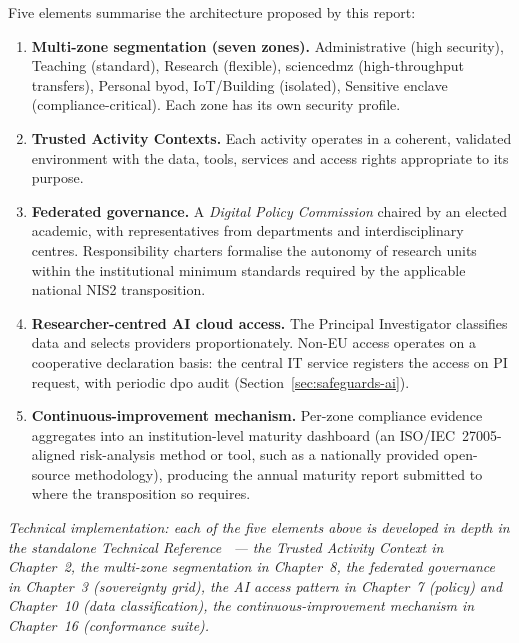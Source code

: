 Five elements summarise the architecture proposed by this
report:

\begin{enumerate}[nosep]
    \item \textbf{Multi-zone segmentation (seven zones).}
    Administrative (high security), Teaching (standard),
    Research (flexible), \gls{sciencedmz} (high-throughput
    transfers), Personal \gls{byod}, IoT/Building (isolated),
    Sensitive enclave (compliance-critical). Each zone has its
    own security profile.
    \item \textbf{Trusted Activity Contexts.} Each activity
    operates in a coherent, validated environment with the data,
    tools, services and access rights appropriate to its
    purpose.
    \item \textbf{Federated governance.} A
    \emph{Digital Policy Commission} chaired by an elected
    academic, with representatives from departments and
    interdisciplinary centres. Responsibility charters formalise
    the autonomy of research units within the institutional
    minimum standards required by the applicable national NIS2
    transposition.
    \item \textbf{Researcher-centred AI cloud access.} The
    Principal Investigator classifies data and selects providers
    proportionately. Non-EU access operates on a cooperative
    declaration basis: the central IT service registers the
    access on PI request, with periodic \gls{dpo} audit
    (Section~\ref{sec:safeguards-ai}).
    \item \textbf{Continuous-improvement mechanism.} Per-zone
    compliance evidence aggregates into an institution-level
    maturity dashboard (an ISO/IEC~27005-aligned risk-analysis
    method or tool, such as a nationally provided open-source
    methodology), producing the annual maturity report
    submitted to  where
    the transposition so requires.
\end{enumerate}

\smallskip
\noindent\textit{\footnotesize Technical implementation: each of
the five elements above is developed in depth in the standalone
Technical Reference~\cite{ng-tech-ref-2026} --- the Trusted
Activity Context in Chapter~2, the multi-zone segmentation in
Chapter~8, the federated governance in Chapter~3
(sovereignty grid), the AI access pattern in Chapter~7 (policy)
and Chapter~10 (data classification), the continuous-improvement
mechanism in Chapter~16 (conformance suite).}

